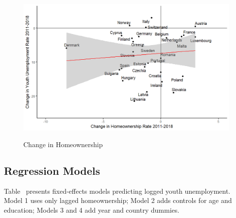 \documentclass[11pt]{article}
\begin{document}
\begin{multicols}{2}
		\begin{figure}[H]
			\centering
			\caption{Change in Homeownership}
			\includegraphics[width=1\linewidth]{change_homeownership_7years.png}
			\label{fig:change_homeownership_7years}
		\end{figure}
		\vspace{-1em}
		
		\subsection*{Regression Models}
		\indent Table~ presents fixed-effects models predicting logged youth unemployment. Model 1 uses only lagged homeownership; Model 2 adds controls for age and education; Models 3 and 4 add year and country dummies.
		

\end{multicols}
\end{document}
